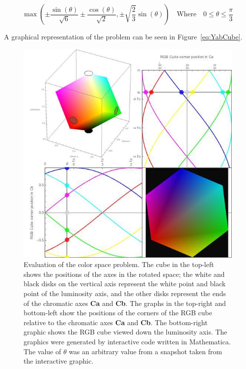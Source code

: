 \begin{equation}\label{eq:AxisRangeMinMax}

 \max\left(\pm\frac{\sin (\theta )}{\sqrt{6}}\pm\frac{\cos (\theta )}{\sqrt{2}}, \pm\sqrt{\frac{2}{3}} \sin (\theta ) \right) \quad \text{Where} \quad 0\leq \theta \leq \frac{\pi}{3}

\end{equation}



A graphical representation of the problem can be seen in Figure~\ref{eq:YabCube}.



\begin{figure}[h!]

  \centering

    \includegraphics[width=\textwidth]{Chapter2/Figs/CornersOf_theRGBCube.jpg}

    \caption{Evaluation of the color space problem. The cube in the top-left shows the positions of the axes in the rotated space; the white and black disks on the vertical axis represent the white point and black point of the luminosity axis, and the other disks represent the ends of the chromatic axes \textbf{Ca} and \textbf{Cb}. The graphs in the top-right and bottom-left show the positions of the corners of the RGB cube relative to the chromatic axes \textbf{Ca} and \textbf{Cb}. The bottom-right graphic shows the RGB cube viewed down the luminosity axis. The graphics were generated by interactive code written in Mathematica. The value of $\theta$ was an arbitrary value from a snapshot taken from the interactive graphic.}\label{fig:YABCubeEval}

\end{figure}



